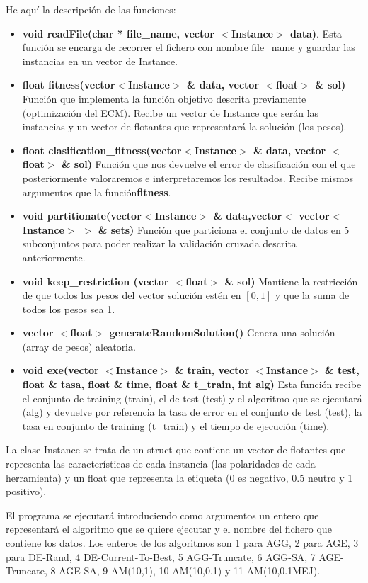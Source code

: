 He aquí la descripción de las funciones:
\begin{itemize}
	\item \textbf{void readFile(char * file\_name, vector $<$Instance$>$ data)}.
	Esta función se encarga de recorrer el fichero con nombre file\_name y guardar las instancias en un vector de Instance.
	\item \textbf{float fitness(vector$<$Instance$>$ \& data, vector $<$float$>$ \& sol)}
	Función que implementa la función objetivo descrita previamente (optimización del ECM). Recibe un vector de Instance que serán las instancias y un vector de flotantes que representará la solución (los pesos).
	\item \textbf{float clasification\_fitness(vector$<$Instance$>$ \& data, vector $<$float$>$ \& sol)}
	Función que nos devuelve el error de clasificación con el que posteriormente valoraremos e interpretaremos los resultados. Recibe mismos argumentos que la función\textbf{fitness}.
	\item \textbf{void partitionate(vector$<$Instance$>$ \& data,vector$<$ vector$<$Instance$>$ $>$ \& sets)}
	Función que particiona el conjunto de datos en 5 subconjuntos para poder realizar la validación cruzada descrita anteriormente.
	\item \textbf{void keep\_restriction (vector $<$float$>$ \& sol)}
	Mantiene la restricción de que todos los pesos del vector solución estén en $[0,1]$ y que la suma de todos los pesos sea 1.
	\item \textbf{vector $<$float$>$ generateRandomSolution()}
	Genera una solución (array de pesos) aleatoria.
	\item \textbf{void exe(vector $<$Instance$>$ \& train, vector $<$Instance$>$ \& test, float \& tasa, float \& time, float \& t\_train, int alg)}
	Esta función recibe el conjunto de training (train), el de test (test) y el algoritmo que se ejecutará (alg) y devuelve por referencia la tasa de error en el conjunto de test (test), la tasa en conjunto de training (t\_train) y el tiempo de ejecución (time).
\end{itemize}
La clase Instance se trata de un struct que contiene un vector de flotantes que representa las características de cada instancia (las polaridades de cada herramienta) y un float que representa la etiqueta (0 es negativo, 0.5 neutro y 1 positivo).

El programa se ejecutará introduciendo como argumentos un entero que representará el algoritmo que se quiere ejecutar y el nombre del fichero que contiene los datos. Los enteros de los algoritmos son 1 para AGG, 2 para AGE, 3 para DE-Rand, 4 DE-Current-To-Best, 5 AGG-Truncate, 6 AGG-SA, 7 AGE-Truncate, 8 AGE-SA, 9 AM(10,1), 10 AM(10,0.1) y 11 AM(10,0.1MEJ).
